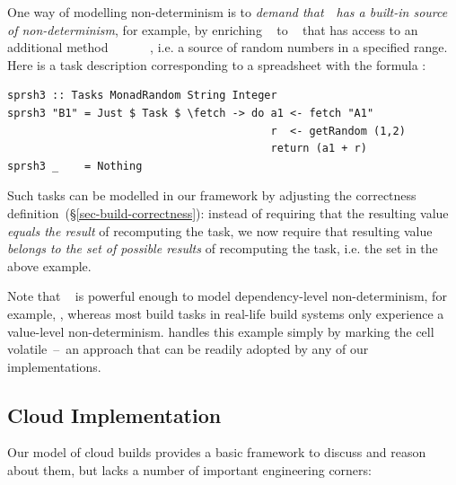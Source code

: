 One way of modelling non-determinism is to \emph{demand that}~~\emph{has a
built-in source of non-determinism}, for example, by enriching
~ to ~ that has access to an
additional method
~\hs{::}~~~\hs{->}~~,
i.e. a source of random numbers in a specified range. Here is a task description
corresponding to a spreadsheet with the formula :

\begin{verbatim}
sprsh3 :: Tasks MonadRandom String Integer
sprsh3 "B1" = Just $ Task $ \fetch -> do a1 <- fetch "A1"
                                         r  <- getRandom (1,2)
                                         return (a1 + r)
sprsh3 _    = Nothing
\end{verbatim}
\vspace{1mm}

\noindent
Such tasks can be modelled in our framework by adjusting the correctness
definition~(\S\ref{sec-build-correctness}): instead of requiring that the
resulting value \emph{equals the result} of recomputing the task, we now require
that resulting value \emph{belongs to the set of possible results} of
recomputing the task, i.e. the set  in the above
example.


Note that ~ is powerful enough to model
dependency-level non-determinism, for example,
, whereas most build tasks in real-life
build systems only experience a value-level non-determinism. \Excel handles this
example simply by marking the cell volatile~--~an approach that can be readily
adopted by any of our implementations.

\subsection{Cloud Implementation}\label{sec-cloud-aspects}

Our model of cloud builds provides a basic framework to discuss and reason
about them, but lacks a number of important engineering corners:


